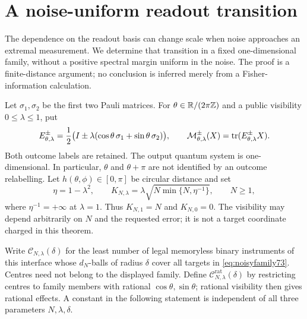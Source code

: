\section{A noise-uniform readout transition}\label{sec:noisyreadout73}
The dependence on the readout basis can change scale when noise approaches
an extremal measurement. We determine that transition in a fixed
one-dimensional family, without a positive spectral margin uniform in
the noise. The proof is a finite-distance argument; no conclusion is
inferred merely from a Fisher-information calculation.

Let $\sigma_1,\sigma_2$ be the first two Pauli matrices. For
$\theta\in\mathbb R/(2\pi\mathbb Z)$ and a public visibility $0\le\lambda\le1$, put
\begin{equation}\label{eq:noisyfamily73}
 E_{\theta,\lambda}^{\pm}
 =\frac12\bigl(I\pm\lambda(\cos\theta\,\sigma_1+
                                  \sin\theta\,\sigma_2)\bigr),\qquad
 \mathcal M_{\theta,\lambda}^{\pm}(X)=\operatorname{tr}(E_{\theta,\lambda}^{\pm}X).
\end{equation}
Both outcome labels are retained. The output quantum system is
one-dimensional. In particular, $\theta$ and $\theta+\pi$ are not
identified by an outcome relabelling. Let $h(\theta,\phi)\in[0,\pi]$
be circular distance and set
\begin{equation}\label{eq:noisyscale73}
 \eta=1-\lambda^2,\qquad
 K_{N,\lambda}=\lambda\sqrt{N\min\{N,\eta^{-1}\}},\qquad N\ge1,
\end{equation}
where $\eta^{-1}=+\infty$ at $\lambda=1$. Thus $K_{N,1}=N$ and
$K_{N,0}=0$. The visibility may depend arbitrarily on $N$ and the
requested error; it is not a target coordinate charged in this theorem.

Write $\mathcal C_{N,\lambda}(\delta)$ for the least number of legal
memoryless binary instruments of this interface whose $d_N$-balls of
radius $\delta$ cover all targets in \eqref{eq:noisyfamily73}.
Centres need not belong to the displayed family. Define
$\mathcal C^{\mathrm{rat}}_{N,\lambda}(\delta)$ by restricting centres
to family members with rational $\cos\theta,\sin\theta$; rational
visibility then gives rational effects. A constant in the following
statement is independent of all three parameters $N,\lambda,\delta$.

